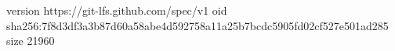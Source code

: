 version https://git-lfs.github.com/spec/v1
oid sha256:7f8d3df3a3b87d60a58abe4d592758a11a25b7bcdc5905fd02cf527e501ad285
size 21960
